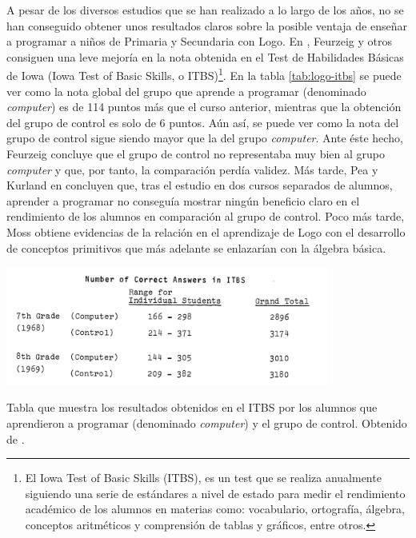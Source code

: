 A pesar de los diversos estudios que se han realizado a lo largo de los años, no se han conseguido obtener unos resultados claros sobre la posible ventaja de enseñar a programar a niños de Primaria y Secundaria con Logo. En \cite{feurzeig1969programming}, Feurzeig y otros consiguen una leve mejoría en la nota obtenida en el Test de Habilidades Básicas de Iowa (Iowa Test of Basic Skills, o ITBS)\footnote{El Iowa Test of Basic Skills (ITBS), es un test que se realiza anualmente siguiendo una serie de estándares a nivel de estado para medir el rendimiento académico de los alumnos en materias como: vocabulario, ortografía, álgebra, conceptos aritméticos y comprensión de tablas y gráficos, entre otros.}. En la tabla \ref{tab:logo-itbs} se puede ver como la nota global del grupo que aprende a programar (denominado \emph{computer}) es de 114 puntos más que el curso anterior, mientras que la obtención del grupo de control es solo de 6 puntos. Aún así, se puede ver como la nota del grupo de control sigue siendo mayor que la del grupo \emph{computer}. Ante éste hecho, Feurzeig concluye que el grupo de control no representaba muy bien al grupo \emph{computer} y que, por tanto, la comparación perdía validez.
Más tarde, Pea y Kurland en \cite{pea1984logo} concluyen que, tras el estudio en dos cursos separados de alumnos, aprender a programar no conseguía mostrar ningún beneficio claro en el rendimiento de los alumnos en comparación al grupo de control.
Poco más tarde, Moss \cite{moss1985creating} obtiene evidencias de la relación en el aprendizaje de Logo con el desarrollo de conceptos primitivos que más adelante se enlazarían con la álgebra básica.


\begin{table}[!ht]
	\begin{centering}
		\includegraphics[width=0.8\textwidth]{images/logo-itbs.png}
			\caption{Tabla que muestra los resultados obtenidos en el ITBS por los alumnos que aprendieron a programar (denominado \emph{computer}) y el grupo de control. Obtenido de \cite[p.251]{feurzeig1969programming}.}
				\label{tab:logo-itbs}
	\end{centering}
\end{table}


